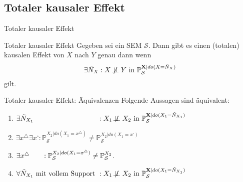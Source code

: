 \subsection{Totaler kausaler Effekt}
\begin{frame}{Totaler kausaler Effekt}
    \begin{block}{Totaler kausaler Effekt}
        Gegeben sei ein SEM $\mathcal{S}$. Dann gibt es einen
        (totalen) kausalen Effekt von $X$ nach $Y$ genau dann wenn
        \[\exists \tilde{N}_X : X \not\!\perp\!\!\!\perp Y \text{ in } \mathbb{P}_\mathcal{S}^{\mathbf{X}|do(X=\tilde{N}_X)}\]
        gilt.
    \end{block}
\end{frame}

\begin{frame}[t]{Totaler kausaler Effekt: Äquivalenzen}
    Folgende Aussagen sind äquivalent:

    \begin{enumerate}[label=(\roman*)]
        \item $\exists \tilde{N}_{X_1} \hphantom{\text{ mit vollem Support }}: X_1 \not\!\perp\!\!\!\perp X_2 \text{ in } \mathbb{P}_\mathcal{S}^{\mathbf{X}|do(X_1=\tilde{N}_{X_1})}$
        \item $\exists x^\triangle \exists x^\square: \mathbb{P}_\mathcal{S}^{X_2|do(X_1=x^\triangle)} \neq \mathbb{P}_\mathcal{S}^{X_2|do(X_1=x^\square)}$
        \item $\exists x^\triangle \hphantom{\exists x^\square}: \mathbb{P}_\mathcal{S}^{X_2|do(X_1=x^\triangle)} \neq \mathbb{P}_\mathcal{S}^{X_2}$.
        \item $\forall \tilde{N}_{X_1} \text{ mit vollem Support }: X_1 \not\!\perp\!\!\!\perp X_2 \text{ in } \mathbb{P}_\mathcal{S}^{\mathbf{X}|do(X_1=\tilde{N}_{X_1})}$
    \end{enumerate}


\end{frame}
